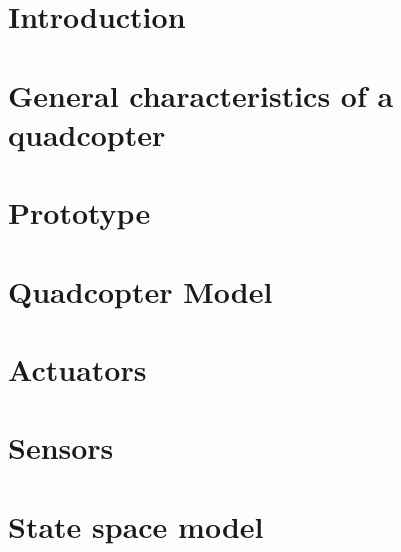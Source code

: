 




\sloppy
{}


\cleardoublepage

\date{\today}
\cleardoublepage

\tableofcontents

\cleardoublepage



\chapter{Introduction}\label{ch:introduction}

\clearpage

\chapter{General characteristics of a quadcopter}\label{ch:problemdesc}


\clearpage

\chapter{Prototype}\label{ch:psetup}


\clearpage

\chapter{Quadcopter Model}\label{ch:quadmodelling}

\clearpage

%

\chapter{Actuators}\label{ch:lab}


\clearpage
\chapter{Sensors}\label{ch:lab}



\clearpage

\chapter{State space model}\label{ch:lab}

\clearpage

